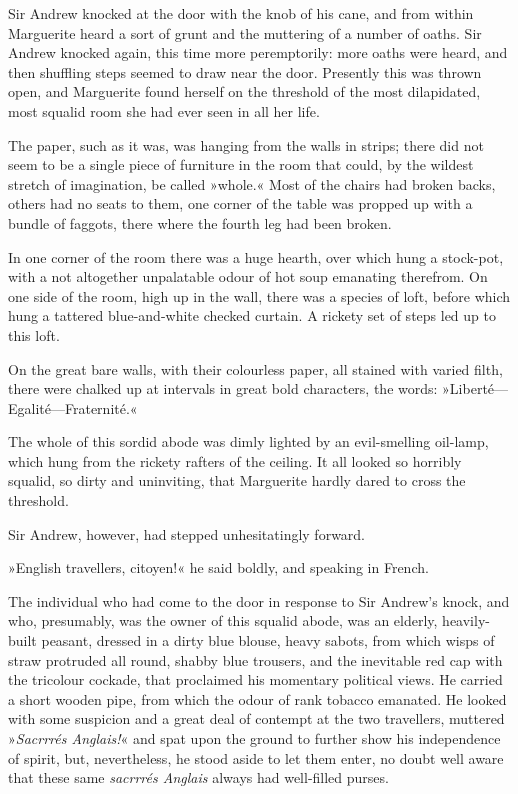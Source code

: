 Sir Andrew knocked at the door with the knob of his cane, and from within Marguerite heard a sort of grunt and the muttering of a number of oaths. Sir Andrew knocked again, this time more peremptorily: more oaths were heard, and then shuffling steps seemed to draw near the door. Presently this was thrown open, and Marguerite found herself on the threshold of the most dilapidated, most squalid room she had ever seen in all her life.

The paper, such as it was, was hanging from the walls in strips; there did not seem to be a single piece of furniture in the room that could, by the wildest stretch of imagination, be called »whole.« Most of the chairs had broken backs, others had no seats to them, one corner of the table was propped up with a bundle of faggots, there where the fourth leg had been broken.

In one corner of the room there was a huge hearth, over which hung a stock-pot, with a not altogether unpalatable odour of hot soup emanating therefrom. On one side of the room, high up in the wall, there was a species of loft, before which hung a tattered blue-and-white checked curtain. A rickety set of steps led up to this loft.

On the great bare walls, with their colourless paper, all stained with varied filth, there were chalked up at intervals in great bold characters, the words: »Liberté\allowbreak---\allowbreak Egalité\allowbreak---\allowbreak Fraternité.«

The whole of this sordid abode was dimly lighted by an evil-smelling oil-lamp, which hung from the rickety rafters of the ceiling. It all looked so horribly squalid, so dirty and uninviting, that Marguerite hardly dared to cross the threshold.

Sir Andrew, however, had stepped unhesitatingly forward.

»English travellers, citoyen!« he said boldly, and speaking in French.

The individual who had come to the door in response to Sir Andrew's knock, and who, presumably, was the owner of this squalid abode, was an elderly, heavily-built peasant, dressed in a dirty blue blouse, heavy sabots, from which wisps of straw protruded all round, shabby blue trousers, and the inevitable red cap with the tricolour cockade, that proclaimed his momentary political views. He carried a short wooden pipe, from which the odour of rank tobacco emanated. He looked with some suspicion and a great deal of contempt at the two travellers, muttered »\textit{Sacrrrés Anglais!}« and spat upon the ground to further show his independence of spirit, but, nevertheless, he stood aside to let them enter, no doubt well aware that these same \textit{sacrrrés Anglais} always had well-filled purses.

